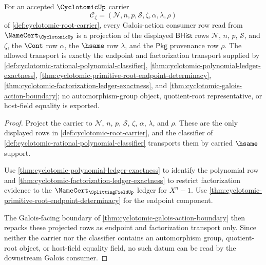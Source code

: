 \begin{theorem}
\label{thm:cyclotomic-galois-action-namecert-boundary}
For an accepted $\CyclotomicUp$ carrier
$$
\mathcal{C}_{\zeta}=(\mathcal{N},n,p,\mathcal{S},\zeta,\alpha,\lambda,\rho)
$$
of \autoref{def:cyclotomic-root-carrier}, every Galois-action consumer row read from $\NameCert_{\CyclotomicUp}$ is a projection of the displayed $\mathsf{BHist}$ rows $\mathcal{N}$, $n$, $p$, $\mathcal{S}$, and $\zeta$, the $\Cont$ row $\alpha$, the $\hsame$ row $\lambda$, and the $\mathsf{Pkg}$ provenance row $\rho$. The allowed transport is exactly the endpoint and factorization transport supplied by \autoref{def:cyclotomic-rational-polynomial-classifier}, \autoref{thm:cyclotomic-polynomial-ledger-exactness}, \autoref{thm:cyclotomic-primitive-root-endpoint-determinacy}, \autoref{thm:cyclotomic-factorization-ledger-exactness}, and \autoref{thm:cyclotomic-galois-action-boundary}; no automorphism-group object, quotient-root representative, or host-field equality is exported.
\end{theorem}
\begin{proof}
Project the carrier to $\mathcal{N}$, $n$, $p$, $\mathcal{S}$, $\zeta$, $\alpha$, $\lambda$, and $\rho$. These are the only displayed rows in \autoref{def:cyclotomic-root-carrier}, and the classifier of \autoref{def:cyclotomic-rational-polynomial-classifier} transports them by carried $\hsame$ support.

Use \autoref{thm:cyclotomic-polynomial-ledger-exactness} to identify the polynomial row and \autoref{thm:cyclotomic-factorization-ledger-exactness} to restrict factorization evidence to the $\NameCert_{\SplittingFieldUp}$ ledger for $X^n-1$. Use \autoref{thm:cyclotomic-primitive-root-endpoint-determinacy} for the endpoint component.

The Galois-facing boundary of \autoref{thm:cyclotomic-galois-action-boundary} then repacks these projected rows as endpoint and factorization transport only. Since neither the carrier nor the classifier contains an automorphism group, quotient-root object, or host-field equality field, no such datum can be read by the downstream Galois consumer.
\end{proof}

